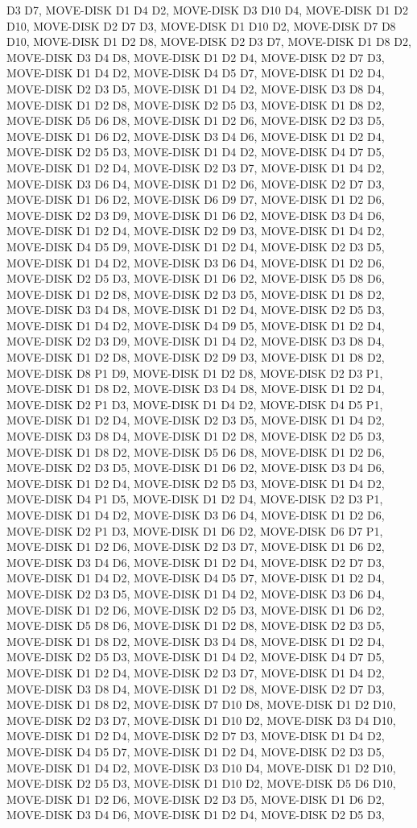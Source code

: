 \documentclass[12pt]{article}
\begin{document}
\begin{appendix}
\begin{itemize}
D3 D7,  MOVE-DISK D1 D4 D2,  MOVE-DISK D3 D10 D4,  MOVE-DISK D1 D2 D10,  MOVE-DISK D2 D7 D3,  MOVE-DISK D1 D10 D2,  MOVE-DISK D7 D8 D10,  MOVE-DISK D1 D2 D8,  MOVE-DISK D2 D3 D7,  MOVE-DISK D1 D8 D2,  MOVE-DISK D3 D4 D8,  MOVE-DISK D1 D2 D4,  MOVE-DISK D2 D7 D3,  MOVE-DISK D1 D4 D2,  MOVE-DISK D4 D5 D7,  MOVE-DISK D1 D2 D4,  MOVE-DISK D2 D3 D5,  MOVE-DISK D1 D4 D2,  MOVE-DISK D3 D8 D4,  MOVE-DISK D1 D2 D8,  MOVE-DISK D2 D5 D3,  MOVE-DISK D1 D8 D2,  MOVE-DISK D5 D6 D8,  MOVE-DISK D1 D2 D6,  MOVE-DISK D2 D3 D5,  MOVE-DISK D1 D6 D2,  MOVE-DISK D3 D4 D6,  MOVE-DISK D1 D2 D4,  MOVE-DISK D2 D5 D3,  MOVE-DISK D1 D4 D2,  MOVE-DISK D4 D7 D5,  MOVE-DISK D1 D2 D4,  MOVE-DISK D2 D3 D7,  MOVE-DISK D1 D4 D2,  MOVE-DISK D3 D6 D4,  MOVE-DISK D1 D2 D6,  MOVE-DISK D2 D7 D3,  MOVE-DISK D1 D6 D2,  MOVE-DISK D6 D9 D7,  MOVE-DISK D1 D2 D6,  MOVE-DISK D2 D3 D9,  MOVE-DISK D1 D6 D2,  MOVE-DISK D3 D4 D6,  MOVE-DISK D1 D2 D4,  MOVE-DISK D2 D9 D3,  MOVE-DISK D1 D4 D2,  MOVE-DISK D4 D5 D9,  MOVE-DISK D1 D2 D4,  MOVE-DISK D2 D3 D5,  MOVE-DISK D1 D4 D2,  MOVE-DISK D3 D6 D4,  MOVE-DISK D1 D2 D6,  MOVE-DISK D2 D5 D3,  MOVE-DISK D1 D6 D2,  MOVE-DISK D5 D8 D6,  MOVE-DISK D1 D2 D8,  MOVE-DISK D2 D3 D5,  MOVE-DISK D1 D8 D2,  MOVE-DISK D3 D4 D8,  MOVE-DISK D1 D2 D4,  MOVE-DISK D2 D5 D3,  MOVE-DISK D1 D4 D2,  MOVE-DISK D4 D9 D5,  MOVE-DISK D1 D2 D4,  MOVE-DISK D2 D3 D9,  MOVE-DISK D1 D4 D2,  MOVE-DISK D3 D8 D4,  MOVE-DISK D1 D2 D8,  MOVE-DISK D2 D9 D3,  MOVE-DISK D1 D8 D2,  MOVE-DISK D8 P1 D9,  MOVE-DISK D1 D2 D8,  MOVE-DISK D2 D3 P1,  MOVE-DISK D1 D8 D2,  MOVE-DISK D3 D4 D8,  MOVE-DISK D1 D2 D4,  MOVE-DISK D2 P1 D3,  MOVE-DISK D1 D4 D2,  MOVE-DISK D4 D5 P1,  MOVE-DISK D1 D2 D4,  MOVE-DISK D2 D3 D5,  MOVE-DISK D1 D4 D2,  MOVE-DISK D3 D8 D4,  MOVE-DISK D1 D2 D8,  MOVE-DISK D2 D5 D3,  MOVE-DISK D1 D8 D2,  MOVE-DISK D5 D6 D8,  MOVE-DISK D1 D2 D6,  MOVE-DISK D2 D3 D5,  MOVE-DISK D1 D6 D2,  MOVE-DISK D3 D4 D6,  MOVE-DISK D1 D2 D4,  MOVE-DISK D2 D5 D3,  MOVE-DISK D1 D4 D2,  MOVE-DISK D4 P1 D5,  MOVE-DISK D1 D2 D4,  MOVE-DISK D2 D3 P1,  MOVE-DISK D1 D4 D2,  MOVE-DISK D3 D6 D4,  MOVE-DISK D1 D2 D6,  MOVE-DISK D2 P1 D3,  MOVE-DISK D1 D6 D2,  MOVE-DISK D6 D7 P1,  MOVE-DISK D1 D2 D6,  MOVE-DISK D2 D3 D7,  MOVE-DISK D1 D6 D2,  MOVE-DISK D3 D4 D6,  MOVE-DISK D1 D2 D4,  MOVE-DISK D2 D7 D3,  MOVE-DISK D1 D4 D2,  MOVE-DISK D4 D5 D7,  MOVE-DISK D1 D2 D4,  MOVE-DISK D2 D3 D5,  MOVE-DISK D1 D4 D2,  MOVE-DISK D3 D6 D4,  MOVE-DISK D1 D2 D6,  MOVE-DISK D2 D5 D3,  MOVE-DISK D1 D6 D2,  MOVE-DISK D5 D8 D6,  MOVE-DISK D1 D2 D8,  MOVE-DISK D2 D3 D5,  MOVE-DISK D1 D8 D2,  MOVE-DISK D3 D4 D8,  MOVE-DISK D1 D2 D4,  MOVE-DISK D2 D5 D3,  MOVE-DISK D1 D4 D2,  MOVE-DISK D4 D7 D5,  MOVE-DISK D1 D2 D4,  MOVE-DISK D2 D3 D7,  MOVE-DISK D1 D4 D2,  MOVE-DISK D3 D8 D4,  MOVE-DISK D1 D2 D8,  MOVE-DISK D2 D7 D3,  MOVE-DISK D1 D8 D2,  MOVE-DISK D7 D10 D8,  MOVE-DISK D1 D2 D10,  MOVE-DISK D2 D3 D7,  MOVE-DISK D1 D10 D2,  MOVE-DISK D3 D4 D10,  MOVE-DISK D1 D2 D4,  MOVE-DISK D2 D7 D3,  MOVE-DISK D1 D4 D2,  MOVE-DISK D4 D5 D7,  MOVE-DISK D1 D2 D4,  MOVE-DISK D2 D3 D5,  MOVE-DISK D1 D4 D2,  MOVE-DISK D3 D10 D4,  MOVE-DISK D1 D2 D10,  MOVE-DISK D2 D5 D3,  MOVE-DISK D1 D10 D2,  MOVE-DISK D5 D6 D10,  MOVE-DISK D1 D2 D6,  MOVE-DISK D2 D3 D5,  MOVE-DISK D1 D6 D2,  MOVE-DISK D3 D4 D6,  MOVE-DISK D1 D2 D4,  MOVE-DISK D2 D5 D3,  
\end{itemize}
\end{appendix}
\end{document}
